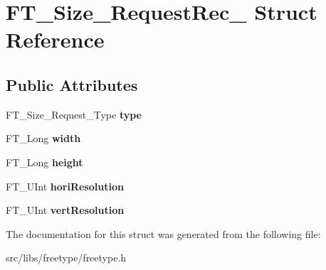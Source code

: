 \hypertarget{struct_f_t___size___request_rec__}{
\section{FT\_\-Size\_\-RequestRec\_\- Struct Reference}
\label{struct_f_t___size___request_rec__}
}
\subsection*{Public Attributes}
\begin{DoxyCompactItemize}
\item 
\hypertarget{struct_f_t___size___request_rec___a7644b04dd2b26c0698df558775320494}{
FT\_\-Size\_\-Request\_\-Type {\bfseries type}}
\label{struct_f_t___size___request_rec___a7644b04dd2b26c0698df558775320494}

\item 
\hypertarget{struct_f_t___size___request_rec___a7b044d36af318b053d5e3939eb0d5039}{
FT\_\-Long {\bfseries width}}
\label{struct_f_t___size___request_rec___a7b044d36af318b053d5e3939eb0d5039}

\item 
\hypertarget{struct_f_t___size___request_rec___af8142450d8d032e1870d758cdcfa51a9}{
FT\_\-Long {\bfseries height}}
\label{struct_f_t___size___request_rec___af8142450d8d032e1870d758cdcfa51a9}

\item 
\hypertarget{struct_f_t___size___request_rec___a3a85704d13561d9db53aa60f7805ec73}{
FT\_\-UInt {\bfseries horiResolution}}
\label{struct_f_t___size___request_rec___a3a85704d13561d9db53aa60f7805ec73}

\item 
\hypertarget{struct_f_t___size___request_rec___a86601c38d91064b6efe256a9e99c56f4}{
FT\_\-UInt {\bfseries vertResolution}}
\label{struct_f_t___size___request_rec___a86601c38d91064b6efe256a9e99c56f4}

\end{DoxyCompactItemize}


The documentation for this struct was generated from the following file:\begin{DoxyCompactItemize}
\item 
src/libs/freetype/freetype.h\end{DoxyCompactItemize}
